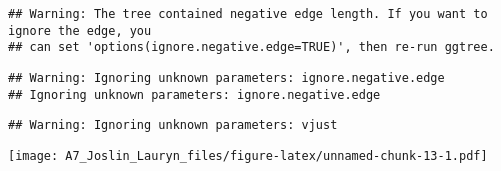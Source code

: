 \documentclass[
]{article}
\begin{document}
\begin{verbatim}
## Warning: The tree contained negative edge length. If you want to ignore the edge, you
## can set 'options(ignore.negative.edge=TRUE)', then re-run ggtree.
\end{verbatim}

\begin{verbatim}
## Warning: Ignoring unknown parameters: ignore.negative.edge
## Ignoring unknown parameters: ignore.negative.edge
\end{verbatim}

\begin{verbatim}
## Warning: Ignoring unknown parameters: vjust
\end{verbatim}

\texttt{[image: A7\_Joslin\_Lauryn\_files/figure-latex/unnamed-chunk-13-1.pdf]}
\end{document}
